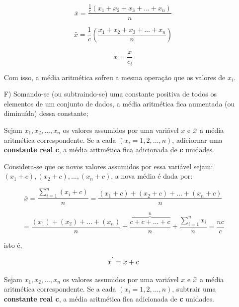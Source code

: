 \begin{enumerate}
\begin{equation*}\label{media3}
     \bar{x}= \frac{ \frac{1}{c} \left( x_{1}+x_{2}+x_{3}+\ldots+x_{n} \right)}{n}
\end{equation*}

\begin{equation*}\label{media3}
     \bar{x}= \frac{1}{c} \left( \frac{x_{1}+x_{2}+x_{3}+\ldots+x_{n}}{n} \right)
\end{equation*}

\begin{equation*}\label{media3}
     \bar{x}= \frac{\bar{x}}{c_{i}}
\end{equation*}

Com isso, a média aritmética sofreu a mesma operação que os valores de $x_{i}$.

\item [{F)}] Somando-se (ou subtraindo-se) uma constante positiva de todos os elementos de um conjunto de dados, a média aritmética fica aumentada (ou diminuída) dessa constante;

\newpage
\textbf{} 
\vskip0.3cm

Sejam $x_{1}, x_{2},...,x_{n}$ os valores assumidos por uma variável $x$ e $\Bar{x}$ a média aritmética correspondente. Se a cada $(x_{i}=1,2,...,n)$, adiciornar uma \textbf{constante real c}, a média aritmética fica adicionada de \textbf{c} unidades.\vskip0.3cm

Considera-se que os novos valores assumidos por essa variável sejam: $(x_{1}+c),(x_{2}+c),...,(x_{n}+c)$, a nova média é dada por:

\begin{equation*}\label{media3}
     \bar{x}= \frac{\sum_{i=1}^{n}(x_{i}+c)}{n}=\frac{(x_{1}+c)+(x_{2}+c)+...+(x_{n}+c)}{n} 
\end{equation*}

\begin{equation*}\label{media4}
  =\frac{(x_{1})+(x_{2})+...+(x_{n})}{n}+ \overbrace{\frac{c+c+...+c}{n}}^{n}+\frac{\sum_{i=1}^{n}x_{i}}{n}=\frac{nc}{c}
\end{equation*}

isto é, 

$$\Bar{x}^{'}=\Bar{x}+c$$



\vskip0.3cm
\textbf{} 
\vskip0.3cm

Sejam $x_{1}, x_{2},...,x_{n}$ os valores assumidos por uma variável $x$ e $\Bar{x}$ a média aritmética correspondente. Se a cada $(x_{i}=1,2,...,n)$, subtrair uma \textbf{constante real c}, a média aritmética fica adicionada de \textbf{c} unidades.\vskip0.3cm



\end{enumerate}
